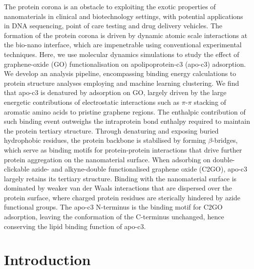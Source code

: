 The protein corona is an obstacle to exploiting the exotic properties of nanomaterials in clinical and biotechnology settings, with potential applications in DNA sequencing, point of care testing and drug delivery vehicles. The formation of the protein corona is driven by dynamic atomic scale interactions at the bio-nano interface, which are impenetrable using conventional experimental techniques. Here, we use molecular dynamics simulations to study the effect of graphene-oxide (GO) functionalisation on apolipoprotein-c3 (apo-c3) adsorption. We develop an analysis pipeline, encompassing binding energy calculations to protein structure analyses employing  and machine learning clustering. We find that apo-c3 is denatured by adsorption on GO, largely driven by the large energetic contributions of electrostatic interactions such as $\pi$-$\pi$ stacking of aromatic amino acids to pristine graphene regions. The enthalpic contribution of such binding event outweighs the intraprotein bond enthalpy required to maintain the protein tertiary structure. Through denaturing and exposing buried hydrophobic residues, the protein backbone is stabilised by forming $\beta$-bridges, which serve as binding motifs for protein-protein interactions that drive further protein aggregation on the nanomaterial surface. When adsorbing on double-clickable azide- and alkyne-double functionalised graphene oxide (C2GO), apo-c3 largely retains its tertiary structure. Binding with the nanomaterial surface is dominated by weaker van der Waals interactions that are dispersed over the protein surface, where charged protein residues are sterically hindered by azide functional groups. The apo-c3 N-terminus is the binding motif for C2GO adsorption, leaving the  conformation of the C-terminus unchanged, hence conserving the lipid binding function of apo-c3.

\section{Introduction}

